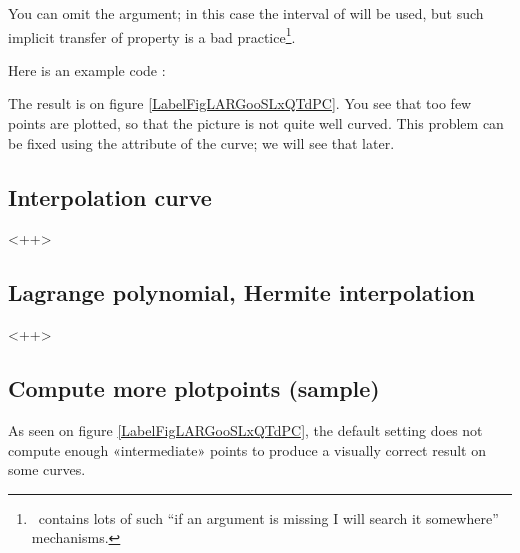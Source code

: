You can omit the  argument; in this case the interval of  will be used, but such implicit transfer of property is a bad practice\footnote{\phystricks\ contains lots of such ``if an argument is missing I will search it somewhere'' mechanisms.}.

Here is an example code :


The result is on figure \ref{LabelFigLARGooSLxQTdPC}. You see that too few points are plotted, so that the picture is not quite well curved. This problem can be fixed using the  attribute of the curve; we will see that later.

\newcommand{\CaptionFigLARGooSLxQTdPC}{This is a parametric curve, a Lyssajou.}


\subsection{Interpolation curve}

<++>

\subsection{Lagrange polynomial, Hermite interpolation}

<++>

\subsection{Compute more plotpoints (sample)}

As seen on figure \ref{LabelFigLARGooSLxQTdPC}, the default setting does not compute enough «intermediate» points to produce a visually correct result on some curves.


